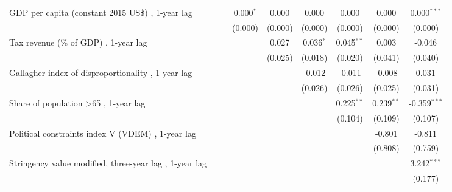 \begin{table}[htbp]
\begin{tabular}{lcccccccc}
      GDP per capita (constant 2015 US\$) , 1-year lag                                   &         &         & 0.000$^{*}$ & 0.000   & 0.000       & 0.000        & 0.000        & 0.000$^{***}$\\   
                                                                                         &         &         & (0.000)     & (0.000) & (0.000)     & (0.000)      & (0.000)      & (0.000)\\   
      Tax revenue (\% of GDP) , 1-year lag                                               &         &         &             & 0.027   & 0.036$^{*}$ & 0.045$^{**}$ & 0.003        & -0.046\\   
                                                                                         &         &         &             & (0.025) & (0.018)     & (0.020)      & (0.041)      & (0.040)\\   
      Gallagher index of disproportionality , 1-year lag                                 &         &         &             &         & -0.012      & -0.011       & -0.008       & 0.031\\   
                                                                                         &         &         &             &         & (0.026)     & (0.026)      & (0.025)      & (0.031)\\   
      Share of population >65 , 1-year lag                                               &         &         &             &         &             & 0.225$^{**}$ & 0.239$^{**}$ & -0.359$^{***}$\\   
                                                                                         &         &         &             &         &             & (0.104)      & (0.109)      & (0.107)\\   
      Political constraints index V (VDEM) , 1-year lag                                  &         &         &             &         &             &              & -0.801       & -0.811\\   
                                                                                         &         &         &             &         &             &              & (0.808)      & (0.759)\\   
      Stringency value modified, three-year lag , 1-year lag                             &         &         &             &         &             &              &              & 3.242$^{***}$\\   
                                                                                         &         &         &             &         &             &              &              & (0.177)\\   

\end{tabular}
\end{table}
